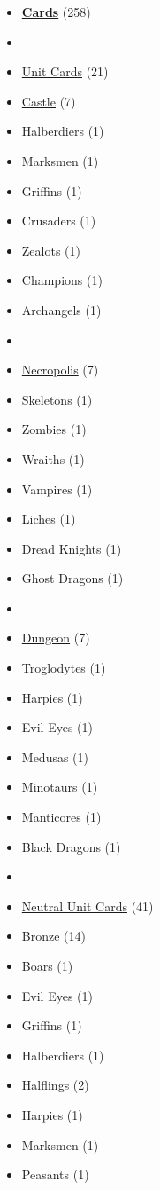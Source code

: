 \begin{multicols}{3}
\begin{itemize}[leftmargin=0pt, label={}, noitemsep, noitemsep]
  \item \textbf{\underline{Cards}} (258)
  \item
  \item \underline{Unit Cards} (21)
  \item \underline{Castle} (7)
  \item Halberdiers (1)
  \item Marksmen (1)
  \item Griffins (1)
  \item Crusaders (1)
  \item Zealots (1)
  \item Champions (1)
  \item Archangels (1)
  \item
  \item \underline{Necropolis} (7)
  \item Skeletons (1)
  \item Zombies (1)
  \item Wraiths (1)
  \item Vampires (1)
  \item Liches (1)
  \item Dread Knights (1)
  \item Ghost Dragons (1)
  \item
  \item \underline{Dungeon} (7)
  \item Troglodytes (1)
  \item Harpies (1)
  \item Evil Eyes (1)
  \item Medusas (1)
  \item Minotaurs (1)
  \item Manticores (1)
  \item Black Dragons (1)
  \item
  \item \underline{Neutral Unit Cards} (41)
  \item \underline{Bronze} (14)
  \item Boars (1)
  \item Evil Eyes (1)
  \item Griffins (1)
  \item Halberdiers (1)
  \item Halflings (2)
  \item Harpies (1)
  \item Marksmen (1)
  \item Peasants (1)

\end{itemize}
\end{multicols}
